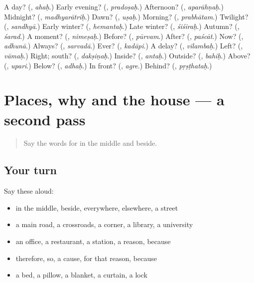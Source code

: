 \begin{tcolorbox}[breakable,colback=teal!4,colframe=teal!35!black,title={Before you move on}]
A day? (\textbf{}, \emph{ahaḥ}.) Early evening? (\textbf{}, \emph{pradoṣaḥ}.) Afternoon? (\textbf{}, \emph{aparāhṇaḥ}.) Midnight? (\textbf{}, \emph{madhyarātriḥ}.) Dawn? (\textbf{}, \emph{uṣaḥ}.) Morning? (\textbf{}, \emph{prabhātam}.) Twilight? (\textbf{}, \emph{sandhyā}.) Early winter? (\textbf{}, \emph{hemantaḥ}.) Late winter? (\textbf{}, \emph{śiśiraḥ}.) Autumn? (\textbf{}, \emph{śarad}.) A moment? (\textbf{}, \emph{nimeṣaḥ}.) Before? (\textbf{}, \emph{pūrvam}.) After? (\textbf{}, \emph{paścāt}.) Now? (\textbf{}, \emph{adhunā}.) Always? (\textbf{}, \emph{sarvadā}.) Ever? (\textbf{}, \emph{kadāpi}.) A delay? (\textbf{}, \emph{vilambaḥ}.) Left? (\textbf{}, \emph{vāmaḥ}.) Right; south? (\textbf{}, \emph{dakṣiṇaḥ}.) Inside? (\textbf{}, \emph{antaḥ}.) Outside? (\textbf{}, \emph{bahiḥ}.) Above? (\textbf{}, \emph{upari}.) Below? (\textbf{}, \emph{adhaḥ}.) In front? (\textbf{}, \emph{agre}.) Behind? (\textbf{}, \emph{pṛṣṭhataḥ}.)
\end{tcolorbox}
\section[(dialogue)]{Places, why and the house — a second pass}

\label{lesson:SA-R99-second-pass-places-why-and-the-house}



\begin{quote}
Say the words for in the middle and beside.
\end{quote}

\subsection*{Your turn}
Say these aloud:

\begin{itemize}
\raggedright
  \item in the middle, beside, everywhere, elsewhere, a street
  \item a main road, a crossroads, a corner, a library, a university
  \item an office, a restaurant, a station, a reason, because
  \item therefore, so, a cause, for that reason, because
  \item a bed, a pillow, a blanket, a curtain, a lock
\end{itemize}

